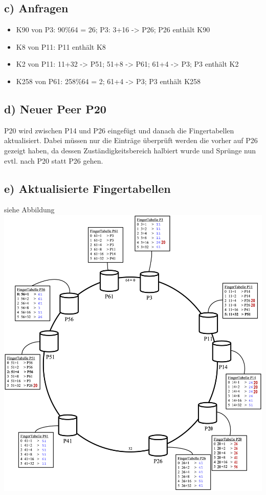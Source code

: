 \documentclass[11pt,a4paper]{scrartcl}
\begin{document}
\subsection*{c) Anfragen}
\begin{itemize}
\item{K90 von P3:} 90\%64 = 26; P3: 3+16 -> P26; P26 enthält K90
\item{K8 von P11:} P11 enthält K8
\item{K2 von P11:} 11+32 -> P51; 51+8 -> P61; 61+4 -> P3; P3 enthält K2
\item{K258 von P61:} 258\%64 = 2; 61+4 -> P3; P3 enthält K258
\end{itemize}

\subsection*{d) Neuer Peer P20}
P20 wird zwischen P14 und P26 eingefügt und danach die Fingertabellen aktualisiert.
Dabei müssen nur die Einträge überprüft werden die vorher auf P26 gezeigt haben, da dessen Zuständigkeitsbereich halbiert wurde und Sprünge nun evtl. nach P20 statt P26 gehen.

\subsection*{e) Aktualisierte Fingertabellen}
siehe Abbildung\\
\includegraphics[width=\textwidth]{Chord2.png}
\end{document}
